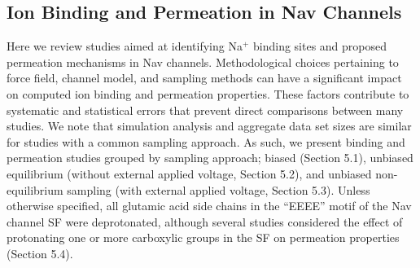 \begin{refsection}
 \section{Ion Binding and Permeation in Nav Channels}
 Here we review studies aimed at identifying Na$^{+}$ binding sites and proposed permeation mechanisms in Nav channels.  Methodological choices pertaining to force field, channel model, and sampling methods can have a significant impact on computed ion binding and permeation properties.  These factors contribute to systematic and statistical errors that prevent direct comparisons between many studies. We note that simulation analysis and aggregate data set sizes are similar for studies with a common sampling approach.  As such, we present binding and permeation studies grouped by sampling approach; biased (Section 5.1), unbiased equilibrium (without external applied voltage, Section 5.2), and unbiased non-equilibrium sampling (with external applied voltage, Section 5.3).  Unless otherwise specified, all glutamic acid side chains in the ``EEEE'' motif of the Nav channel SF were deprotonated, although several studies considered the effect of protonating one or more carboxylic groups in the SF on permeation properties (Section 5.4).
 

\end{refsection}
